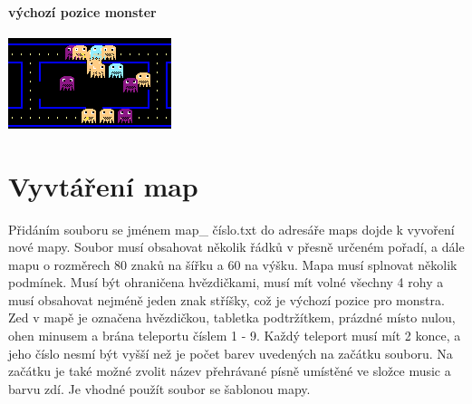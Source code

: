 \documentclass[10pt,a4paper]{article}
\begin{document}
\paragraph{výchozí pozice monster}
\begin{center}
\includegraphics[scale=0.7]{images/monsters.png}
\end{center}
\section{Vyvtáření map}
Přidáním souboru se jménem map\_ číslo.txt do adresáře maps dojde k vyvoření nové mapy. Soubor musí obsahovat několik řádků v přesně určeném pořadí, a dále mapu o rozměrech 80 znaků na šířku a 60 na výšku. Mapa musí splnovat několik podmínek. Musí být ohraničena hvězdičkami, musí mít volné všechny 4 rohy a musí obsahovat nejméně jeden znak stříšky, což je výchozí pozice pro monstra. Zed v mapě je označena hvězdičkou, tabletka podtržítkem, prázdné místo nulou, ohen minusem a brána teleportu číslem 1 - 9. Každý teleport musí mít 2 konce, a jeho číslo nesmí být vyšší než je počet barev uvedených na začátku souboru. Na začátku je také možné zvolit název přehrávané písně umístěné ve složce music a barvu zdí. Je vhodné použít soubor se šablonou mapy.
\end{document}
